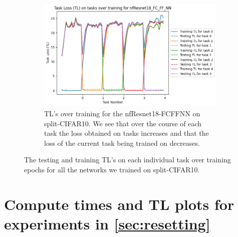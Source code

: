 \begin{appendices}
\begin{figure}[ht]
    \begin{subfigure}[t]{0.4\textwidth}
      \includegraphics[width=\linewidth]{images/CIFAR10_CL/nfResnet18_FC_FF_NN_TL_task.png}
      \caption{TL's over training for the nfResnet18-FCFFNN on split-CIFAR10. We see that over the course of each task the loss obtained on tasks increases and that the loss of the current task being trained on decreases.}
   \end{subfigure}
    
    \caption{The testing and training TL's on each individual task over training epochs for all the networks we trained on split-CIFAR10.}
    \label{fig:CIFAR10-CL-TL}
\end{figure}

\FloatBarrier
\section{Compute times and TL plots for experiments in \cref{sec:resetting}}
\label{sec:resetting-TL}


\end{appendices}
